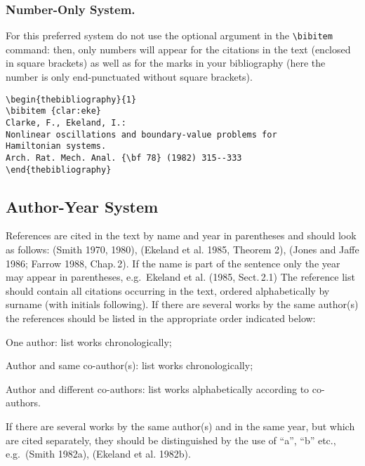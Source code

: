 \subsubsection*{Number-Only System.}
%
For this preferred system do not use the optional argument
in the \verb|\bibitem| command: then, only numbers will
appear for the citations in the text (enclosed in square brackets)
as well as for the marks in your
bibliography (here the number is only end-punctuated without
square brackets).
\begin{verbatim}
\begin{thebibliography}{1}
\bibitem {clar:eke}
Clarke, F., Ekeland, I.:
Nonlinear oscillations and boundary-value problems for
Hamiltonian systems.
Arch. Rat. Mech. Anal. {\bf 78} (1982) 315--333
\end{thebibliography}
\end{verbatim}
%
\subsection{Author-Year System}
%
References are cited in the text by name and year in parentheses
and should look as follows:
(Smith 1970, 1980), (Ekeland et al. 1985, Theorem 2), (Jones and Jaffe
1986; Farrow 1988, Chap.\,2). If the name is part of the sentence
only the year may appear in parentheses,
e.g.\ Ekeland et al. (1985, Sect.\,2.1)
The reference list should contain all citations occurring in the text,
ordered alphabetically by surname (with initials following). If there
are several works by the same author(s) the references should be listed
in the appropriate order indicated below:
\begin{alpherate}
\setlength{\hfuzz}{5pt}
\item
One author: list works chronologically;
\item
Author and same co-author(s): list works chronologically;
\item
Author and different co-authors: list works alphabetically
according to co-authors.
\end{alpherate}
If there are several works by the same author(s) and in the same year,
but which are cited separately, they should be distinguished by the use
of ``a'', ``b'' etc., e.g.\ (Smith 1982a), (Ekeland et al. 1982b).
%
